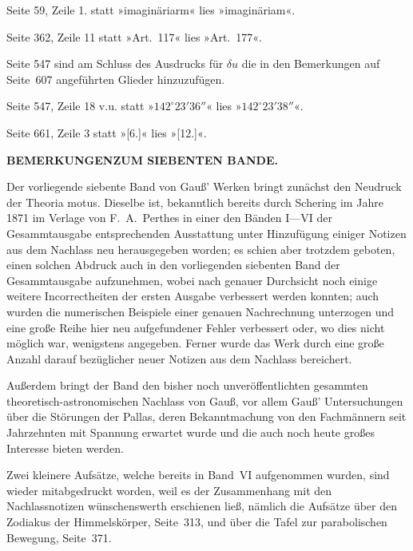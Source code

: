 \documentclass[10pt,a4paper]{article}
\begin{document}
Seite 59, Zeile 1. statt »imaginäriarm« lies »imaginäriam«.

Seite 362, Zeile 11 statt »Art.~117« lies »Art.~177«.

Seite 547 sind am Schluss des Ausdrucks für $\delta u$ die in den Bemerkungen auf Seite~607 angeführten Glieder hinzuzufügen.

Seite 547, Zeile 18 v.u. statt »$142^{\circ} 23' 36''$« lies »$142^{\circ} 23' 38''$«.

Seite 661, Zeile 3 statt »[6.]« lies »[12.]«.

\newpage

\begin{center}
\textbf{BEMERKUNGEN}\hfill\textbf{ZUM SIEBENTEN BANDE.}
\end{center}

\vspace{1em}

Der vorliegende siebente Band von Gau\ss' Werken bringt zunächst den Neudruck der Theoria motus. Dieselbe ist, bekanntlich bereits durch Schering im Jahre 1871 im Verlage von F.~A.~Perthes in einer den Bänden I---VI der Gesammtausgabe entsprechenden Ausstattung unter Hinzufügung einiger Notizen aus dem Nachlass neu herausgegeben worden; es schien aber trotzdem geboten, einen solchen Abdruck auch in den vorliegenden siebenten Band der Gesammtausgabe aufzunehmen, wobei nach genauer Durchsicht noch einige weitere Incorrectheiten der ersten Ausgabe verbessert werden konnten; auch wurden die numerischen Beispiele einer genauen Nachrechnung unterzogen und eine große Reihe hier neu aufgefundener Fehler verbessert oder, wo dies nicht möglich war, wenigstens angegeben. Ferner wurde das Werk durch eine große Anzahl darauf bezüglicher neuer Notizen aus dem Nachlass bereichert.

Außerdem bringt der Band den bisher noch unveröffentlichten gesammten theoretisch-astronomischen Nachlass von Gau\ss, vor allem Gau\ss' Untersuchungen über die Störungen der Pallas, deren Bekanntmachung von den Fachmännern seit Jahrzehnten mit Spannung erwartet wurde und die auch noch heute großes Interesse bieten werden.

Zwei kleinere Aufsätze, welche bereits in Band~VI aufgenommen wurden, sind wieder mitabgedruckt worden, weil es der Zusammenhang mit den Nachlassnotizen wünschenswerth erschienen ließ, nämlich die Aufsätze über den Zodiakus der Himmelskörper, Seite~313, und über die Tafel zur parabolischen Bewegung, Seite~371.
\end{document}
